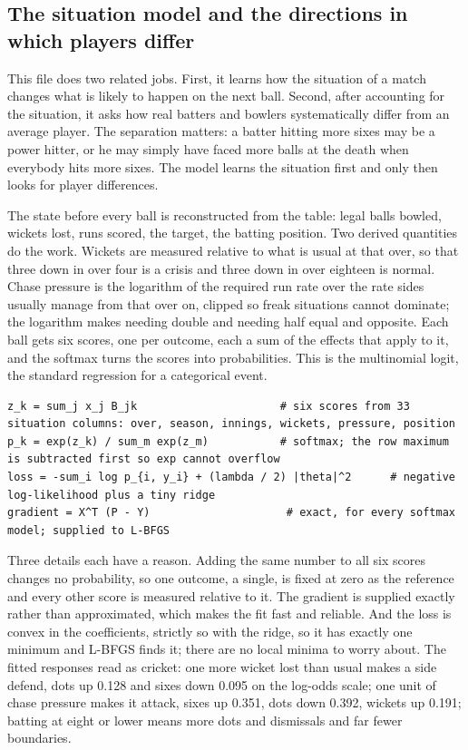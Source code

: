 \documentclass[11pt,letterpaper]{article}
\begin{document}
\subsection{The situation model and the directions in which players differ}

This file does two related jobs. First, it learns how the situation of a match changes what is likely to happen on the next ball. Second, after accounting for the situation, it asks how real batters and bowlers systematically differ from an average player. The separation matters: a batter hitting more sixes may be a power hitter, or he may simply have faced more balls at the death when everybody hits more sixes. The model learns the situation first and only then looks for player differences.


The state before every ball is reconstructed from the table: legal balls bowled, wickets lost, runs scored, the target, the batting position. Two derived quantities do the work. Wickets are measured relative to what is usual at that over, so that three down in over four is a crisis and three down in over eighteen is normal. Chase pressure is the logarithm of the required run rate over the rate sides usually manage from that over on, clipped so freak situations cannot dominate; the logarithm makes needing double and needing half equal and opposite. Each ball gets six scores, one per outcome, each a sum of the effects that apply to it, and the softmax turns the scores into probabilities. This is the multinomial logit, the standard regression for a categorical event.


\begin{lstlisting}
z_k = sum_j x_j B_jk                      # six scores from 33 situation columns: over, season, innings, wickets, pressure, position
p_k = exp(z_k) / sum_m exp(z_m)           # softmax; the row maximum is subtracted first so exp cannot overflow
loss = -sum_i log p_{i, y_i} + (lambda / 2) |theta|^2      # negative log-likelihood plus a tiny ridge
gradient = X^T (P - Y)                     # exact, for every softmax model; supplied to L-BFGS
\end{lstlisting}

Three details each have a reason. Adding the same number to all six scores changes no probability, so one outcome, a single, is fixed at zero as the reference and every other score is measured relative to it. The gradient is supplied exactly rather than approximated, which makes the fit fast and reliable. And the loss is convex in the coefficients, strictly so with the ridge, so it has exactly one minimum and L-BFGS finds it; there are no local minima to worry about. The fitted responses read as cricket: one more wicket lost than usual makes a side defend, dots up 0.128 and sixes down 0.095 on the log-odds scale; one unit of chase pressure makes it attack, sixes up 0.351, dots down 0.392, wickets up 0.191; batting at eight or lower means more dots and dismissals and far fewer boundaries.
\end{document}
